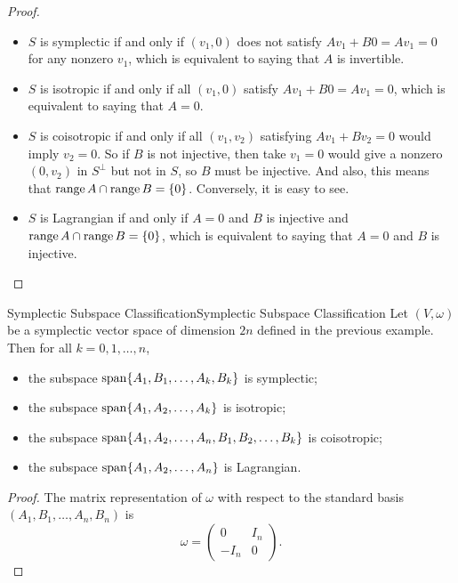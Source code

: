 \documentclass[../main.tex]{subfiles}
\begin{document}
\begin{proof}
  \begin{itemize}
    \item $S$ is symplectic if and only if $(v_1, 0)$ does not satisfy $A v_1 + B 0 = A v_1 = 0$ for any nonzero $v_1$, which is equivalent to saying that $A$ is invertible.
    \item $S$ is isotropic if and only if all $(v_1, 0)$ satisfy $A v_1 + B 0 = A v_1 = 0$, which is equivalent to saying that $A = 0$.
    \item $S$ is coisotropic if and only if all $(v_1, v_2)$ satisfying $A v_1 + B v_2 = 0$ would imply $v_2 = 0$. So if $B$ is not injective, then take $v_1 = 0$ would give a nonzero $(0, v_2)$ in $S^\perp$ but not in $S$, so $B$ must be injective. And also, this means that $\operatorname{range} A \cap \operatorname{range} B = \{0\}$. Conversely, it is easy to see.
    \item $S$ is Lagrangian if and only if $A = 0$ and $B$ is injective and $\operatorname{range} A \cap \operatorname{range} B = \{0\}$, which is equivalent to saying that $A = 0$ and $B$ is injective.
  \end{itemize}
\end{proof}

\begin{example}{Symplectic Subspace Classification}{Symplectic Subspace Classification}
  Let $(V, \omega)$ be a symplectic vector space of dimension $2n$ defined in the previous example. Then for all $k = 0, 1, \dots, n$, 
  \begin{itemize}
    \item the subspace $\operatorname{span}\{A_1, B_1, \dots, A_k, B_k\}$ is symplectic;
    \item the subspace $\operatorname{span}\{A_1, A_2, \dots, A_k\}$ is isotropic;
    \item the subspace $\operatorname{span}\{A_1, A_2, \dots, A_n, B_1, B_2, \dots, B_k\}$ is coisotropic;
    \item the subspace $\operatorname{span}\{A_1, A_2, \dots, A_n\}$ is Lagrangian.
  \end{itemize}
\end{example}
\begin{proof}
  The matrix representation of $\omega$ with respect to the standard basis $(A_1, B_1, \dots, A_n, B_n)$ is
  \begin{equation*}
    \omega = \begin{pmatrix}
      0 & I_n \\
      -I_n & 0
    \end{pmatrix}.
  \end{equation*}
\end{proof}
\end{document}
